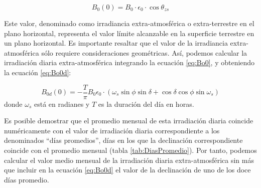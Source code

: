 \begin{equation}
B_{0}(0)=B_{0}\cdot\epsilon_{0}\cdot\cos\theta_{zs}\label{eq:Bo0}\end{equation}

Este valor, denominado como irradiancia extra-atmosférica o extra-terrestre
en el plano horizontal, representa el valor límite alcanzable en la
superficie terrestre en un plano horizontal. Es importante resaltar
que el valor de la irradiancia extra-atmosférica sólo requiere consideraciones
geométricas. Así, podemos calcular la irradiación diaria extra-atmosférica
integrando la ecuación \ref{eq:Bo0}, y obteniendo la ecuación \ref{eq:Bo0d}:

\begin{equation}
B_{0d}(0)=-\frac{T}{\pi}B_{0}\epsilon_{0}\cdot\left(\omega_{s}\sin\phi\sin\delta+\cos\delta\cos\phi\sin\omega_{s}\right)\label{eq:Bo0d}\end{equation}
donde
$\omega_{s}$ está en radianes y $T$ es la duración del día en horas. 

Es posible demostrar que el promedio mensual de esta irradiación
diaria coincide numéricamente con el valor de irradiación diaria
correspondiente a los denominados ``días promedios'', días en los que
la declinación correspondiente coincide con el promedio mensual (tabla
\ref{tab:DiasPromedio}).  Por tanto, podemos calcular el valor medio
mensual de la irradiación diaria extra-atmosférica sin más que incluir
en la ecuación \ref{eq:Bo0d} el valor de la declinación de uno de los
doce días promedio.

